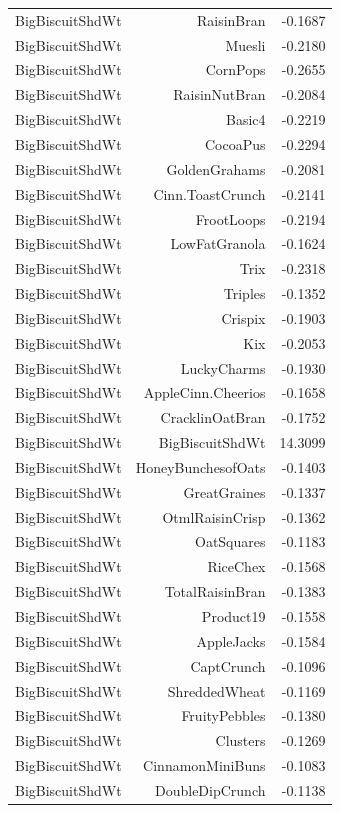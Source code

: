 \begin{longtable}{@{}lrr@{}}
BigBiscuitShdWt & RaisinBran & -0.1687 \\
BigBiscuitShdWt & Muesli & -0.2180 \\
BigBiscuitShdWt & CornPops & -0.2655 \\
BigBiscuitShdWt & RaisinNutBran & -0.2084 \\
BigBiscuitShdWt & Basic4 & -0.2219 \\
BigBiscuitShdWt & CocoaPus & -0.2294 \\
BigBiscuitShdWt & GoldenGrahams & -0.2081 \\
BigBiscuitShdWt & Cinn.ToastCrunch & -0.2141 \\
BigBiscuitShdWt & FrootLoops & -0.2194 \\
BigBiscuitShdWt & LowFatGranola & -0.1624 \\
BigBiscuitShdWt & Trix & -0.2318 \\
BigBiscuitShdWt & Triples & -0.1352 \\
BigBiscuitShdWt & Crispix & -0.1903 \\
BigBiscuitShdWt & Kix & -0.2053 \\
BigBiscuitShdWt & LuckyCharms & -0.1930 \\
BigBiscuitShdWt & AppleCinn.Cheerios & -0.1658 \\
BigBiscuitShdWt & CracklinOatBran & -0.1752 \\
BigBiscuitShdWt & BigBiscuitShdWt & 14.3099 \\
BigBiscuitShdWt & HoneyBunchesofOats & -0.1403 \\
BigBiscuitShdWt & GreatGraines & -0.1337 \\
BigBiscuitShdWt & OtmlRaisinCrisp & -0.1362 \\
BigBiscuitShdWt & OatSquares & -0.1183 \\
BigBiscuitShdWt & RiceChex & -0.1568 \\
BigBiscuitShdWt & TotalRaisinBran & -0.1383 \\
BigBiscuitShdWt & Product19 & -0.1558 \\
BigBiscuitShdWt & AppleJacks & -0.1584 \\
BigBiscuitShdWt & CaptCrunch & -0.1096 \\
BigBiscuitShdWt & ShreddedWheat & -0.1169 \\
BigBiscuitShdWt & FruityPebbles & -0.1380 \\
BigBiscuitShdWt & Clusters & -0.1269 \\
BigBiscuitShdWt & CinnamonMiniBuns & -0.1083 \\
BigBiscuitShdWt & DoubleDipCrunch & -0.1138 \\

\end{longtable}
